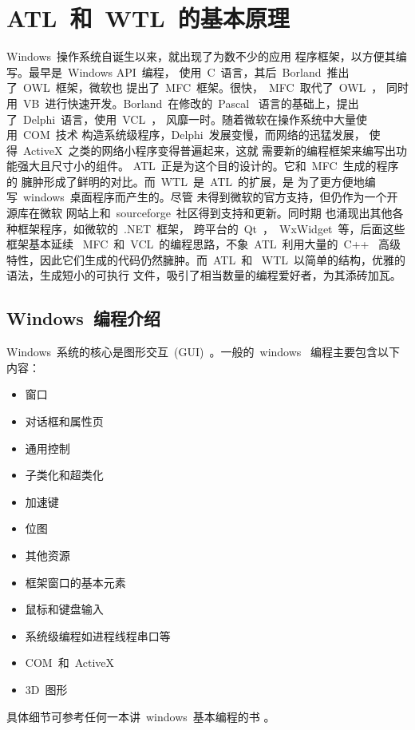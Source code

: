 ﻿%
%

\chapter{ATL~和~WTL~的基本原理}

Windows~操作系统自诞生以来，就出现了为数不少的应用
程序框架，以方便其编写。最早是~Windows API~编程，
使用~C~语言，其后~Borland~推出了~OWL~框架，微软也
提出了~MFC~框架。很快，~MFC~取代了~OWL~，
同时用~VB~进行快速开发。Borland~在修改的~Pascal~
语言的基础上，提出了~Delphi~语言，使用~VCL~，
风靡一时。随着微软在操作系统中大量使用~COM~技术
构造系统级程序，Delphi~发展变慢，而网络的迅猛发展，
使得~ActiveX~之类的网络小程序变得普遍起来，这就
需要新的编程框架来编写出功能强大且尺寸小的组件。
ATL~正是为这个目的设计的。它和~MFC~生成的程序的
臃肿形成了鲜明的对比。而~WTL~是~ATL~的扩展，是
为了更方便地编写~windows~桌面程序而产生的。尽管
未得到微软的官方支持，但仍作为一个开源库在微软
网站上和~sourceforge~社区得到支持和更新。同时期
也涌现出其他各种框架程序，如微软的~.NET~框架，
跨平台的~Qt~，~WxWidget~等，后面这些框架基本延续
~MFC~和~VCL~的编程思路，不象~ATL~利用大量的~C++~
高级特性，因此它们生成的代码仍然臃肿。而~ATL~和
~WTL~以简单的结构，优雅的语法，生成短小的可执行
文件，吸引了相当数量的编程爱好者，为其添砖加瓦。

\section{Windows~编程介绍}

Windows~系统的核心是图形交互~(GUI)~。一般的~windows~
编程主要包含以下内容：
\begin{itemize}
    \item 窗口
    \item 对话框和属性页
    \item 通用控制
    \item 子类化和超类化
    \item 加速键
    \item 位图
    \item 其他资源
    \item 框架窗口的基本元素
    \item 鼠标和键盘输入
    \item 系统级编程如进程线程串口等
    \item COM~和~ActiveX
    \item 3D~图形
\end{itemize}

具体细节可参考任何一本讲~windows~基本编程的书
\cite{wincxsj:2004}。

